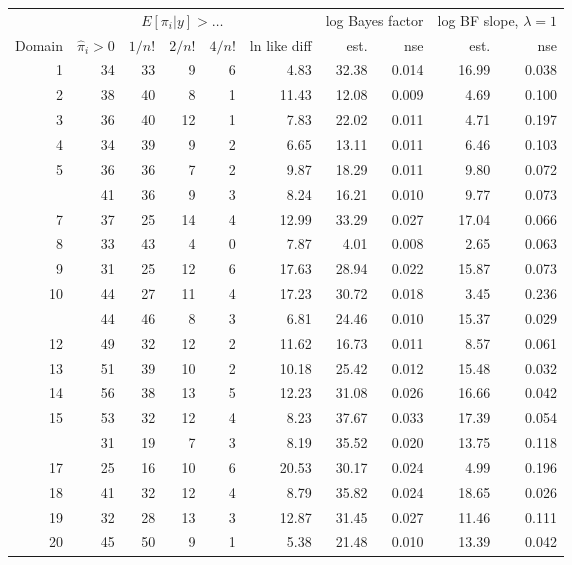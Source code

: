 
\begin{tabular}[t]{rrrrrrrrrr}
\toprule
\multicolumn{1}{c}{ } & \multicolumn{1}{c}{ } & \multicolumn{3}{c}{$E[\pi_i|y]>\ldots$} & \multicolumn{1}{c}{ } & \multicolumn{2}{c}{log Bayes factor} & \multicolumn{2}{c}{log BF slope, $\lambda = 1$} \\
\cmidrule(l{3pt}r{3pt}){3-5} \cmidrule(l{3pt}r{3pt}){7-8} \cmidrule(l{3pt}r{3pt}){9-10}
Domain & $\hat{\pi}_i>0$ & $1/n!$ & $2/n!$ & $4/n!$ & ln like diff & est. & nse & est. & nse\\
\midrule
1 & 34 & 33 & 9 & 6 & 4.83 & 32.38 & 0.014 & 16.99 & 0.038\\
2 & 38 & 40 & 8 & 1 & 11.43 & 12.08 & 0.009 & 4.69 & 0.100\\
3 & 36 & 40 & 12 & 1 & 7.83 & 22.02 & 0.011 & 4.71 & 0.197\\
4 & 34 & 39 & 9 & 2 & 6.65 & 13.11 & 0.011 & 6.46 & 0.103\\
5 & 36 & 36 & 7 & 2 & 9.87 & 18.29 & 0.011 & 9.80 & 0.072\\
\addlinespace
6 & 41 & 36 & 9 & 3 & 8.24 & 16.21 & 0.010 & 9.77 & 0.073\\
7 & 37 & 25 & 14 & 4 & 12.99 & 33.29 & 0.027 & 17.04 & 0.066\\
8 & 33 & 43 & 4 & 0 & 7.87 & 4.01 & 0.008 & 2.65 & 0.063\\
9 & 31 & 25 & 12 & 6 & 17.63 & 28.94 & 0.022 & 15.87 & 0.073\\
10 & 44 & 27 & 11 & 4 & 17.23 & 30.72 & 0.018 & 3.45 & 0.236\\
\addlinespace
11 & 44 & 46 & 8 & 3 & 6.81 & 24.46 & 0.010 & 15.37 & 0.029\\
12 & 49 & 32 & 12 & 2 & 11.62 & 16.73 & 0.011 & 8.57 & 0.061\\
13 & 51 & 39 & 10 & 2 & 10.18 & 25.42 & 0.012 & 15.48 & 0.032\\
14 & 56 & 38 & 13 & 5 & 12.23 & 31.08 & 0.026 & 16.66 & 0.042\\
15 & 53 & 32 & 12 & 4 & 8.23 & 37.67 & 0.033 & 17.39 & 0.054\\
\addlinespace
16 & 31 & 19 & 7 & 3 & 8.19 & 35.52 & 0.020 & 13.75 & 0.118\\
17 & 25 & 16 & 10 & 6 & 20.53 & 30.17 & 0.024 & 4.99 & 0.196\\
18 & 41 & 32 & 12 & 4 & 8.79 & 35.82 & 0.024 & 18.65 & 0.026\\
19 & 32 & 28 & 13 & 3 & 12.87 & 31.45 & 0.027 & 11.46 & 0.111\\
20 & 45 & 50 & 9 & 1 & 5.38 & 21.48 & 0.010 & 13.39 & 0.042\\

\end{tabular}
